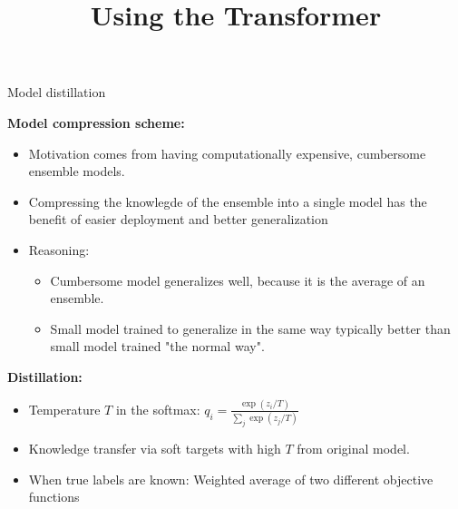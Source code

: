 



\newcommand{\titlefigure}{figure/sesamestreet.jpeg}
\newcommand{\learninggoals}{
\item Understand model distillation in general
\item Training regime of DistilBERT}

\title{Using the Transformer}
\date{}




\begin{frame}{Model distillation \href{https://arxiv.org/pdf/1503.02531.pdf}{}}

\textbf{Model compression scheme:}

\begin{itemize}
	\item Motivation comes from having computationally expensive, cumbersome ensemble models. \href{http://www.niculescu-mizil.org/papers/rtpp364-bucila.rev2.pdf}{}
	\item Compressing the knowlegde of the ensemble into a single model has the benefit of easier deployment and better generalization
	\item Reasoning:
		\begin{itemize}
			\item Cumbersome model generalizes well, because it is the average of an ensemble.
			\item Small model trained to generalize in the same way typically better than small model trained "the normal way".
		\end{itemize}
\end{itemize}

\textbf{Distillation:}

\begin{itemize}
	\item Temperature $T$ in the softmax: $q_i = \frac{\exp(z_i/T)}{\sum_j \exp(z_j/T)}$
	\item Knowledge transfer via soft targets with high $T$ from original model.
	\item When true labels are known: Weighted average of two different objective functions
\end{itemize}

\end{frame}

